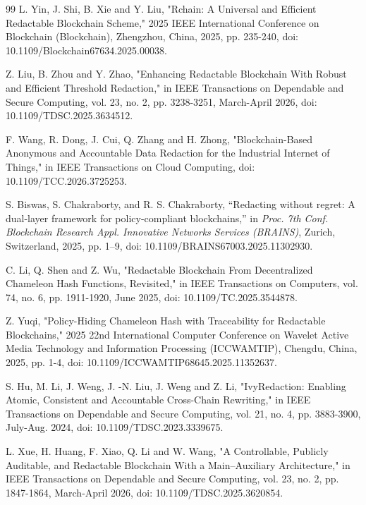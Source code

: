 \documentclass[lettersize,journal]{IEEEtran}
\begin{document}
\begin{thebibliography}{99}
    L. Yin, J. Shi, B. Xie and Y. Liu, "Rchain: A Universal and Efficient Redactable Blockchain Scheme," 2025 IEEE International Conference on Blockchain (Blockchain), Zhengzhou, China, 2025, pp. 235-240, doi: 10.1109/Blockchain67634.2025.00038.
    
    Z. Liu, B. Zhou and Y. Zhao, "Enhancing Redactable Blockchain With Robust and Efficient Threshold Redaction," in IEEE Transactions on Dependable and Secure Computing, vol. 23, no. 2, pp. 3238-3251, March-April 2026, doi: 10.1109/TDSC.2025.3634512.
    
    F. Wang, R. Dong, J. Cui, Q. Zhang and H. Zhong, "Blockchain-Based Anonymous and Accountable Data Redaction for the Industrial Internet of Things," in IEEE Transactions on Cloud Computing, doi: 10.1109/TCC.2026.3725253.
    
    S. Biswas, S. Chakraborty, and R. S. Chakraborty,
    ``Redacting without regret: A dual-layer framework for
    policy-compliant blockchains,''
    in \textit{Proc. 7th Conf. Blockchain Research Appl. Innovative
    Networks Services (BRAINS)}, Zurich, Switzerland, 2025,
    pp. 1--9, doi: 10.1109/BRAINS67003.2025.11302930.
    
    C. Li, Q. Shen and Z. Wu, "Redactable Blockchain From Decentralized Chameleon Hash Functions, Revisited," in IEEE Transactions on Computers, vol. 74, no. 6, pp. 1911-1920, June 2025, doi: 10.1109/TC.2025.3544878.
    
    Z. Yuqi, "Policy-Hiding Chameleon Hash with Traceability for Redactable Blockchains," 2025 22nd International Computer Conference on Wavelet Active Media Technology and Information Processing (ICCWAMTIP), Chengdu, China, 2025, pp. 1-4, doi: 10.1109/ICCWAMTIP68645.2025.11352637.
    
    S. Hu, M. Li, J. Weng, J. -N. Liu, J. Weng and Z. Li, "IvyRedaction: Enabling Atomic, Consistent and Accountable Cross-Chain Rewriting," in IEEE Transactions on Dependable and Secure Computing, vol. 21, no. 4, pp. 3883-3900, July-Aug. 2024, doi: 10.1109/TDSC.2023.3339675.
    
    L. Xue, H. Huang, F. Xiao, Q. Li and W. Wang, "A Controllable, Publicly Auditable, and Redactable Blockchain With a Main–Auxiliary Architecture," in IEEE Transactions on Dependable and Secure Computing, vol. 23, no. 2, pp. 1847-1864, March-April 2026, doi: 10.1109/TDSC.2025.3620854.
    

\end{thebibliography}
\end{document}
